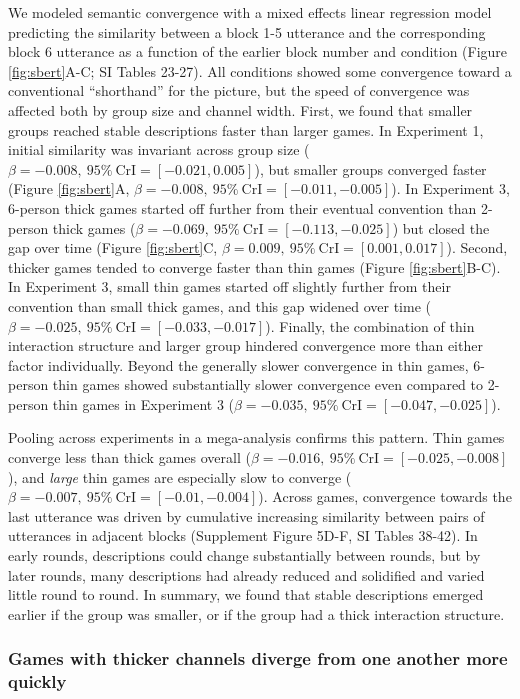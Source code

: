 \documentclass[
  english,
]{article}
\begin{document}
We modeled semantic convergence with a mixed effects linear regression model predicting the similarity between a block 1-5 utterance and the corresponding block 6 utterance as a function of the earlier block number and condition (Figure \ref{fig:sbert}A-C; SI Tables 23-27).
All conditions showed some convergence toward a conventional ``shorthand'' for the picture, but the speed of convergence was affected both by group size and channel width.
First, we found that smaller groups reached stable descriptions faster than larger games.
In Experiment 1, initial similarity was invariant across group size (\(\beta=-0.008,\:95\%\:\mathrm{CrI}=[-0.021, 0.005]\)), but smaller groups converged faster (Figure \ref{fig:sbert}A, \(\beta=-0.008,\:95\%\:\mathrm{CrI}=[-0.011, -0.005]\)).
In Experiment 3, 6-person thick games started off further from their eventual convention than 2-person thick games (\(\beta=-0.069,\:95\%\:\mathrm{CrI}=[-0.113, -0.025]\)) but closed the gap over time (Figure \ref{fig:sbert}C, \(\beta=0.009,\:95\%\:\mathrm{CrI}=[0.001, 0.017]\)).
Second, thicker games tended to converge faster than thin games (Figure \ref{fig:sbert}B-C).
In Experiment 3, small thin games started off slightly further from their convention than small thick games, and this gap widened over time (\(\beta=-0.025,\:95\%\:\mathrm{CrI}=[-0.033, -0.017]\)).
Finally, the combination of thin interaction structure and larger group hindered convergence more than either factor individually.
Beyond the generally slower convergence in thin games, 6-person thin games showed substantially slower convergence even compared to 2-person thin games in Experiment 3 (\(\beta=-0.035,\:95\%\:\mathrm{CrI}=[-0.047, -0.025]\)).

Pooling across experiments in a mega-analysis confirms this pattern.
Thin games converge less than thick games overall (\(\beta=-0.016,\:95\%\:\mathrm{CrI}=[-0.025, -0.008]\)), and \emph{large} thin games are especially slow to converge (\(\beta=-0.007,\:95\%\:\mathrm{CrI}=[-0.01, -0.004]\)).
Across games, convergence towards the last utterance was driven by cumulative increasing similarity between pairs of utterances in adjacent blocks (Supplement Figure 5D-F, SI Tables 38-42).
In early rounds, descriptions could change substantially between rounds, but by later rounds, many descriptions had already reduced and solidified and varied little round to round.
In summary, we found that stable descriptions emerged earlier if the group was smaller, or if the group had a thick interaction structure.

\hypertarget{games-with-thicker-channels-diverge-from-one-another-more-quickly}{%
\subsubsection{Games with thicker channels diverge from one another more quickly}\label{games-with-thicker-channels-diverge-from-one-another-more-quickly}}
\end{document}
